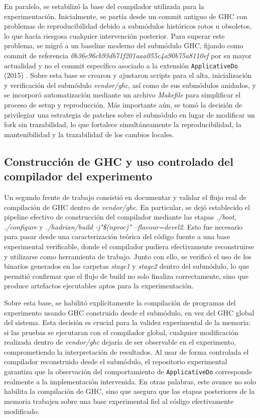 En paralelo, se estabilizó la base del compilador utilizada para la experimentación. Inicialmente, se partía desde un commit antiguo de \textsf{GHC} con problemas de reproducibilidad debido a submódulos históricos rotos u obsoletos, lo que hacía riesgosa cualquier intervención posterior. Para superar este problema, se migró a un baseline moderno del submódulo \textsf{GHC}, fijando como commit de referencia \textit{0b36e96cb93db71f201aaa055c4a90b75a8110ef} por su mayor actualidad y no el commit específico asociado a la extensión \texttt{ApplicativeDo} (2015) \cite{ghc_commit_8ecf6d8}. Sobre esta base se crearon y ajustaron scripts para el alta, inicialización y verificación del submódulo \textit{vendor/ghc}, así como de sus submódulos anidados, y se incorporó automatización mediante un archivo \textit{Makefile} para simplificar el proceso de setup y reproducción. Más importante aún, se tomó la decisión de privilegiar una estrategia de patches sobre el submódulo en lugar de modificar un fork sin trazabilidad, lo que fortalece simultáneamente la reproducibilidad, la mantenibilidad y la trazabilidad de los cambios locales.

\subsection{Construcción de GHC y uso controlado del compilador del experimento}

Un segundo frente de trabajo consistió en documentar y validar el flujo real de compilación de \textsf{GHC} dentro de \textit{vendor/ghc}. En particular, se dejó establecido el pipeline efectivo de construcción del compilador mediante las etapas \textit{./boot}, \textit{./configure} y \textit{./hadrian/build -j"\$(nproc)" --flavour=devel2}. Esto fue necesario para pasar desde una caracterización teórica del código fuente a una base experimental verificable, donde el compilador pudiera efectivamente reconstruirse y utilizarse como herramienta de trabajo. Junto con ello, se verificó el uso de los binarios generados en las carpetas  \textit{stage1} y \textit{stage2} dentro del submódulo, lo que permitió confirmar que el flujo de build no solo finaliza correctamente, sino que produce artefactos ejecutables aptos para la experimentación.

Sobre esta base, se habilitó explícitamente la compilación de programas del experimento usando \textsf{GHC} construido desde el submódulo, en vez del \textsf{GHC} global del sistema. Esta decisión es crucial para la validez experimental de la memoria: si las pruebas se ejecutaran con el compilador global, cualquier modificación realizada dentro de \textit{vendor/ghc} dejaría de ser observable en el experimento, comprometiendo la interpretación de resultados. Al usar de forma controlada el compilador reconstruido desde el submódulo, el repositorio experimental garantiza que la observación del comportamiento de \texttt{ApplicativeDo} corresponde realmente a la implementación intervenida. En otras palabras, este avance no solo habilita la compilación de \textsf{GHC}, sino que asegura que las etapas posteriores de la memoria trabajen sobre una base experimental fiel al código efectivamente modificado.

